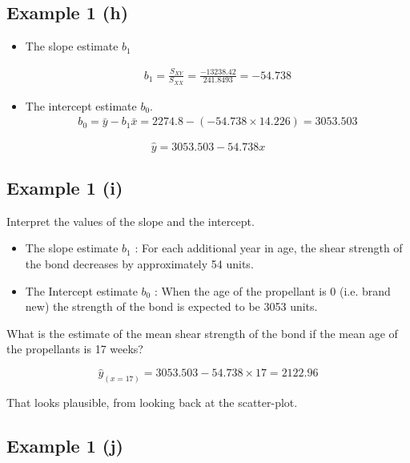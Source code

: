 \documentclass[]{report}
\begin{document}



\subsection{Example 1 (h)}

\begin{itemize}
	\item  The slope estimate $b_1$
	
	\begin{eqnarray*}
		b_1 = \frac{S_{XY}}{S_{XX}} = \frac{-13238.42}{241.8493} = -54.738
	\end{eqnarray*}
	
	\item  The intercept estimate $b_0$.
	\begin{eqnarray*}
		b_0 = \bar{y} -b_1\bar{x} = 2274.8 - (-54.738 \times 14.226) = 3053.503
	\end{eqnarray*}
\end{itemize}

\[ \hat{y}  = 3053.503 -54.738 x \]



\subsection{Example 1 (i)}
Interpret the values of the slope and the intercept.
\begin{itemize}
	\item  The slope estimate $b_1$ :  For each additional year in age, the shear strength of the bond decreases by approximately 54 units.
	\item The Intercept estimate $b_0$ : When the age of the propellant is 0 (i.e. brand new) the strength of the bond is expected to be 3053 units.
\end{itemize}
\bigskip
What is the estimate of the mean shear strength of the bond if the mean age of the propellants is 17 weeks?

\[ \hat{y}_{(x=17)}  = 3053.503 -54.738 \times 17 = 2122.96 \]

That looks plausible, from looking back at the scatter-plot.



\subsection{Example 1 (j)}
\end{document}
